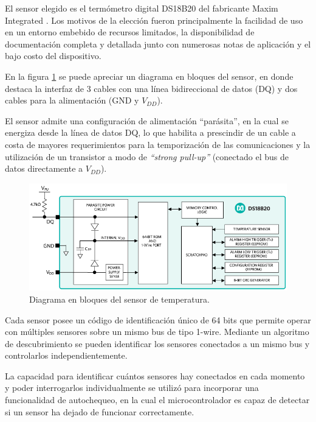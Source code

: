 El sensor elegido es el termómetro digital DS18B20 del fabricante Maxim Integrated \citep{ds18b20}. Los motivos de la elección fueron principalmente la facilidad de uso en un entorno embebido de recursos limitados, la disponibilidad de documentación completa y detallada junto con numerosas notas de aplicación y el bajo costo del dispositivo.

En la figura \ref{fig:ds18b20_bloques} se puede apreciar un diagrama en bloques del sensor, en donde destaca la interfaz de 3 cables con una línea bidireccional de datos (DQ) y dos cables para la alimentación (GND y $V_{DD}$). 

El sensor admite una configuración de alimentación ``parásita'', en la cual se energiza desde la línea de datos DQ, lo que habilita a prescindir de un cable a costa de mayores requerimientos para la temporización de las comunicaciones y la utilización de un transistor a modo de \textit{``strong pull-up''} (conectado el bus de datos directamente a $V_{DD}$).

\begin{figure}[htpb]
	\centering
	\includegraphics[width=.8\textwidth]{./Figures/ds18b20_bloques.png}
	\caption[Diagrama en bloques del sensor de temperatura DS18B20]{Diagrama en bloques del sensor de temperatura\protect\footnotemark.}
	\label{fig:ds18b20_bloques}
\end{figure}


Cada sensor posee un código de identificación único de 64 bits que permite operar con múltiples sensores sobre un mismo bus de tipo 1-wire.  Mediante un algoritmo de descubrimiento se pueden identificar los sensores conectados a un mismo bus y controlarlos independientemente. 

La capacidad para identificar cuántos sensores hay conectados en cada momento y poder interrogarlos individualmente se utilizó para incorporar una funcionalidad de autochequeo, en la cual el microcontrolador es capaz de detectar si un sensor ha dejado de funcionar correctamente.

